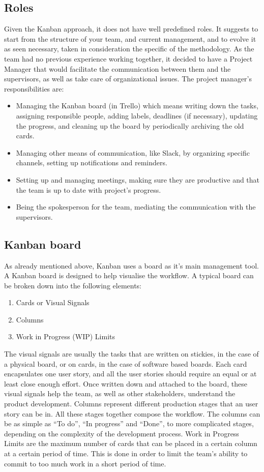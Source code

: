         \subsection{Roles}
Given the Kanban approach, it does not have well predefined roles. It suggests to start from the structure of your team, and current management, and to evolve it as seen necessary, taken in consideration the specific of the methodology.
As the team had no previous experience working together, it decided to have a Project Manager that would facilitate the communication between them and the supervisors, as well as take care of organizational issues.
The project manager’s responsibilities are:
            \begin{itemize}
              \item Managing the Kanban board (in Trello) which means writing down the tasks, assigning responsible people, adding labels, deadlines (if necessary), updating the progress, and cleaning up the board by periodically archiving the old cards.
              \item Managing other means of communication, like Slack, by organizing specific channels, setting up notifications and reminders.
              \item Setting up and managing meetings, making sure they are productive and that the team is up to date with project’s progress.
              \item Being the spokesperson for the team, mediating the communication with the supervisors.
            \end{itemize}
        \subsection{Kanban board}
As already mentioned above, Kanban uses a board as it’s main management tool. A Kanban board is designed to help visualise the workflow. A typical board can be broken down into the following elements:
            \begin{enumerate}
                \item Cards or Visual Signals 
                \item Columns
                \item Work in Progress (WIP) Limits
            \end{enumerate}
The visual signals are usually the tasks that are written on stickies, in the case of a physical board, or on cards, in the case of software based boards. Each card encapsulates one user story, and all the user stories should require an equal or at least close enough effort. Once written down and attached to the board, these visual signals help the team, as well as other stakeholders, understand the product development.
Columns represent different production stages that an user story can be in. All these stages together compose the workflow. The columns can be as simple as “To do”, “In progress” and “Done”, to more complicated stages, depending on the complexity of the development process.
Work in Progress Limits are the maximum number of cards that can be placed in a certain column at a certain period of time. This is done in order to limit the team’s ability to commit to too much work in a short period of time.
